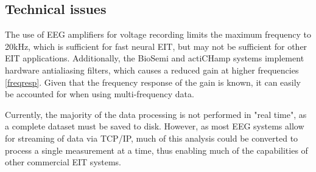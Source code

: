 \subsection{Technical issues}
The use of EEG amplifiers for voltage recording limits the maximum frequency to 20kHz, which is sufficient for fast neural EIT, but may not be sufficient for other EIT applications. Additionally, the BioSemi and actiCHamp systems implement hardware antialiasing filters, which causes a reduced gain at higher frequencies \ref{freqresp}. Given that the frequency response of the gain is known, it can easily be accounted for when using multi-frequency data.

Currently, the majority of the data processing is not performed in "real time", as a complete dataset must be saved to disk. However, as most EEG systems allow for streaming of data via TCP/IP, much of this analysis could be converted to process a single measurement at a time, thus enabling much of the capabilities of other commercial EIT systems.